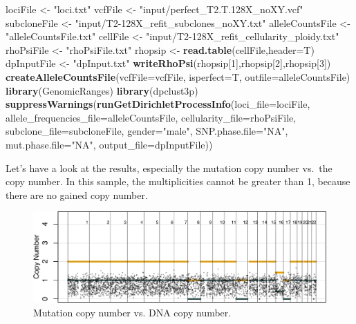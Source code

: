 \documentclass[]{article}
\newenvironment{Shaded}{\begin{snugshade}}{\end{snugshade}}
\newcommand{\DataTypeTok}[1]{\textcolor[rgb]{0.13,0.29,0.53}{#1}}
\newcommand{\DecValTok}[1]{\textcolor[rgb]{0.00,0.00,0.81}{#1}}
\newcommand{\KeywordTok}[1]{\textcolor[rgb]{0.13,0.29,0.53}{\textbf{#1}}}
\newcommand{\NormalTok}[1]{#1}
\newcommand{\StringTok}[1]{\textcolor[rgb]{0.31,0.60,0.02}{#1}}
\begin{document}
\begin{Shaded}
\begin{Highlighting}[]
\NormalTok{lociFile  <-}\StringTok{ "loci.txt"}
\NormalTok{vcfFile <-}\StringTok{ "input/perfect_T2.T.128X_noXY.vcf"}
\NormalTok{subcloneFile <-}\StringTok{ "input/T2-128X_refit_subclones_noXY.txt"}
\NormalTok{alleleCountsFile <-}\StringTok{ "alleleCountsFile.txt"}
\NormalTok{cellFile <-}\StringTok{ "input/T2-128X_refit_cellularity_ploidy.txt"}
\NormalTok{rhoPsiFile <-}\StringTok{ "rhoPsiFile.txt"}
\NormalTok{rhopsip <-}\StringTok{ }\KeywordTok{read.table}\NormalTok{(cellFile,}\DataTypeTok{header=}\NormalTok{T)}
\NormalTok{dpInputFile <-}\StringTok{ "dpInput.txt"}
\KeywordTok{writeRhoPsi}\NormalTok{(rhopsip[}\DecValTok{1}\NormalTok{],rhopsip[}\DecValTok{2}\NormalTok{],rhopsip[}\DecValTok{3}\NormalTok{])}
\KeywordTok{createAlleleCountsFile}\NormalTok{(}\DataTypeTok{vcfFile=}\NormalTok{vcfFile, }\DataTypeTok{isperfect=}\NormalTok{T, }\DataTypeTok{outfile=}\NormalTok{alleleCountsFile)}
\KeywordTok{library}\NormalTok{(GenomicRanges)}
\KeywordTok{library}\NormalTok{(dpclust3p)}
\KeywordTok{suppressWarnings}\NormalTok{(}\KeywordTok{runGetDirichletProcessInfo}\NormalTok{(}\DataTypeTok{loci_file=}\NormalTok{lociFile,}
                                            \DataTypeTok{allele_frequencies_file=}\NormalTok{alleleCountsFile,}
                                            \DataTypeTok{cellularity_file=}\NormalTok{rhoPsiFile,}
                                            \DataTypeTok{subclone_file=}\NormalTok{subcloneFile,}
                                            \DataTypeTok{gender=}\StringTok{"male"}\NormalTok{,}
                                            \DataTypeTok{SNP.phase.file=}\StringTok{"NA"}\NormalTok{,}
                                            \DataTypeTok{mut.phase.file=}\StringTok{"NA"}\NormalTok{,}
                                            \DataTypeTok{output_file=}\NormalTok{dpInputFile))}
\end{Highlighting}
\end{Shaded}

Let's have a look at the results, especially the mutation copy number
vs.~the copy number. In this sample, the multiplicities cannot be
greater than 1, because there are no gained copy number.

\begin{figure}

{\centering \includegraphics{src_guide_files/figure-latex/fig7-1} 

}

\caption{\label{fig7} Mutation copy number vs. DNA copy number.}\label{fig:fig7}
\end{figure}
\end{document}
